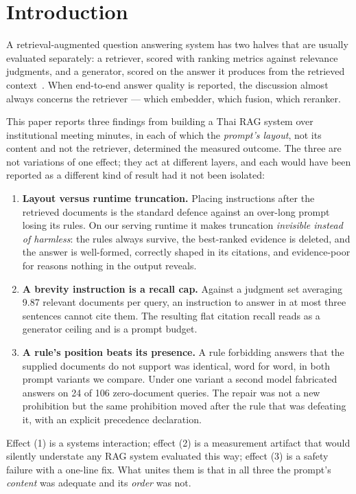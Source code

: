\documentclass[conference]{IEEEtran}
\begin{document}
\section{Introduction}

A retrieval-augmented question answering system has two halves that are usually
evaluated separately: a retriever, scored with ranking metrics against
relevance judgments, and a generator, scored on the answer it produces from the
retrieved context~\cite{lewis2020rag}. When end-to-end answer quality is
reported, the discussion almost always concerns the retriever --- which
embedder, which fusion, which reranker.

This paper reports three findings from building a Thai RAG system over
institutional meeting minutes, in each of which the \emph{prompt's layout}, not
its content and not the retriever, determined the measured outcome. The three
are not variations of one effect; they act at different layers, and each would
have been reported as a different kind of result had it not been isolated:

\begin{enumerate}
\item \textbf{Layout versus runtime truncation.} Placing instructions after the
retrieved documents is the standard defence against an over-long prompt losing
its rules. On our serving runtime it makes truncation \emph{invisible instead of
harmless}: the rules always survive, the best-ranked evidence is deleted, and
the answer is well-formed, correctly shaped in its citations, and evidence-poor
for reasons nothing in the output reveals.
\item \textbf{A brevity instruction is a recall cap.} Against a judgment set
averaging 9.87 relevant documents per query, an instruction to answer in at most
three sentences cannot cite them. The resulting flat citation recall reads as a
generator ceiling and is a prompt budget.
\item \textbf{A rule's position beats its presence.} A rule forbidding answers
that the supplied documents do not support was identical, word for word, in both
prompt variants we compare. Under one variant a second model fabricated answers
on 24 of 106 zero-document queries. The repair was not a new prohibition but the
same prohibition moved after the rule that was defeating it, with an explicit
precedence declaration.
\end{enumerate}

Effect (1) is a systems interaction; effect (2) is a measurement artifact that
would silently understate any RAG system evaluated this way; effect (3) is a
safety failure with a one-line fix. What unites them is that in all three the
prompt's \emph{content} was adequate and its \emph{order} was not.
\end{document}
